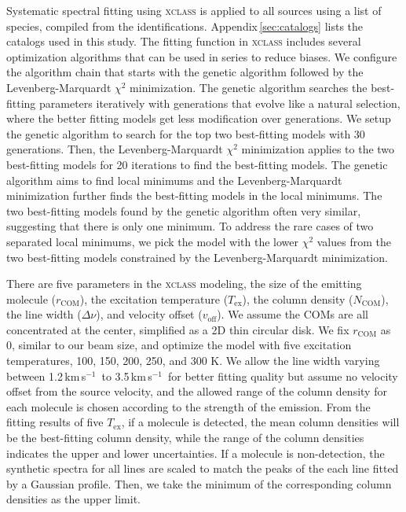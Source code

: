 \documentclass[twocolumn]{aastex62}
\newcommand{\kms}{\mbox{\,km\,s$^{-1}$}}
\begin{document}
Systematic spectral fitting using \textsc{xclass} is applied to all sources using a list of species, compiled from the identifications.  Appendix\,\ref{sec:catalogs} lists the catalogs used in this study.  The fitting function in \textsc{xclass} includes several optimization algorithms that can be used in series to reduce biases.  We configure the algorithm chain that starts with the genetic algorithm followed by the Levenberg-Marquardt $\chi^{2}$ minimization.  The genetic algorithm searches the best-fitting parameters iteratively with generations that evolve like a natural selection, where the better fitting models get less modification over generations.  We setup the genetic algorithm to search for the top two best-fitting models with 30 generations.  Then, the Levenberg-Marquardt $\chi^{2}$ minimization applies to the two best-fitting models for 20 iterations to find the best-fitting models.  The genetic algorithm aims to find local minimums and the Levenberg-Marquardt minimization further finds the best-fitting models in the local minimums.  The two best-fitting models found by the genetic algorithm often very similar, suggesting that there is only one minimum.  To address the rare cases of two separated local minimums, we pick the model with the lower $\chi^{2}$ values from the two best-fitting models constrained by the Levenberg-Marquardt minimization.  

There are five parameters in the \textsc{xclass} modeling, the size of the emitting molecule ($r_\text{COM}$), the excitation temperature ($T_\text{ex}$), the column density ($N_\text{COM}$), the line width ($\Delta \nu$), and velocity offset ($v_\text{off}$).  We assume the COMs are all concentrated at the center, simplified as a 2D thin circular disk.  We fix $r_\text{COM}$ as 0, similar to our beam size, and optimize the model with five excitation temperatures, 100, 150, 200, 250, and 300 K.  We allow the line width varying between 1.2\kms\ to 3.5\kms\ for better fitting quality but assume no velocity offset from the source velocity, and the allowed range of the column density for each molecule is chosen according to the strength of the emission.  From the fitting results of five $T_\text{ex}$, if a molecule is detected, the mean column densities will be the best-fitting column density, while the range of the column densities indicates the upper and lower uncertainties.  If a molecule is non-detection, the synthetic spectra for all lines are scaled to match the peaks of the each line fitted by a Gaussian profile.  Then, we take the minimum of the corresponding column densities as the upper limit.
\end{document}
